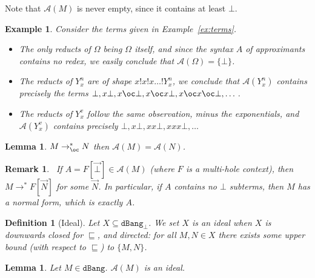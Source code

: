 \documentclass[10pt,a4paper]{article}
\newtheorem{lemma}[theorem]{Lemma}
\newtheorem{definition}[theorem]{Definition}
\newtheorem{example}[theorem]{Example}
\newtheorem{remark}[theorem]{Remark}
\newcommand{\<}{\langle}
\renewcommand{\>}{\rangle}
\newcommand{\dbang}{\ensuremath{\mathtt{dBang}}}
\newcommand{\dbangb}{\ensuremath{\dbang_\bot}}
\newcommand{\todbf}{\to_{\oc}} %
\newcommand{\mcal}[1]{\ensuremath{\mathcal{#1}}}
\newcommand{\setApprox}{\mcal{A}}
\newcommand{\setapprox}{\setApprox}
\newcommand{\smaller}{\ensuremath{\sqsubseteq}}
\begin{document}
Note that $\setApprox{(M)}$ is never empty, since it contains at least $\bot$.

\begin{example}\label{ex:terms-approx}
	Consider the terms given in Example~\ref{ex:terms}.
	\begin{itemize}
		\item The only reducts of $\Omega$ being $\Omega$ itself, and
			since the syntax $A$ of approximants contains no redex,
			we easily conclude that $\setapprox{(\Omega)}=\{\bot\}$.
		\item The reducts of $Y_x^n$ are of shape $x!x!x\dots !Y_x^n$, we
			conclude that $\setapprox{(Y_x^n)}$ contains precisely
			the terms $\bot,x\bot,x\oc\bot,x\oc x\bot,x\oc
			x\oc\bot,\dots $.
		\item The reducts of $Y_x^v$ follow the same observation, minus
			the exponentials, and $\setapprox{(Y_x^v)}$ contains
			precisely $\bot, x\bot,xx\bot,xxx\bot,\dots $
	\end{itemize}
\end{example}

\begin{lemma}
	\label{lem:bang:bohm:reduce-have-same-approxs}
	$M \todbf^* N$ then $\setApprox(M) = \setApprox(N)$.
\end{lemma}

\begin{remark}~\label{rem:approx-normal}
	If $A=F[\vec\bot]\in\setapprox(M)$ (where $F$ is a
	multi-hole context), then $M\to^*F[\vec N]$ for some $\vec N$. In particular, if
	$A$ contains no $\bot$ subterms, then $M$ has a normal form, which is
	exactly $A$.
\end{remark}

\begin{definition}[Ideal]
	Let $X\subseteq \dbangb$. We set $X$ is an \emph{ideal} when $X$ is
	downwards closed for $\smaller$, and directed: for all $M, N \in X$
	there exists some upper	bound (with respect to $\smaller$) to
	$\{M,N\}$.
\end{definition}

\begin{lemma}\label{lem:ideal}
	Let $M\in\dbang$. $\setApprox(M)$ is an ideal.
\end{lemma}
	
\end{document}
